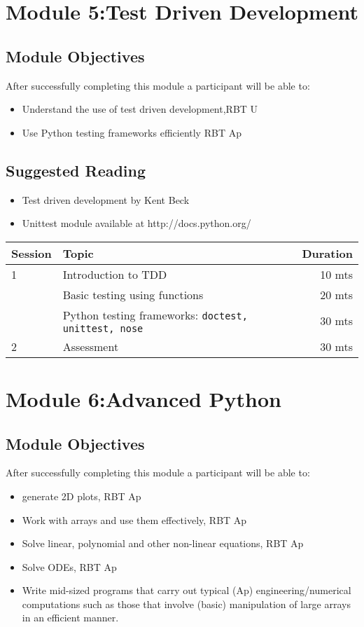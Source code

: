 \documentclass{article}
\begin{document}
\section{Module 5:Test Driven Development}
\label{tdd}
\subsection{Module Objectives}
After successfully completing this module a participant will be able to:
        \begin{itemize}
            \item Understand the use of test driven development,\hfill RBT U
            \item Use Python testing frameworks efficiently  \hfill RBT Ap
        \end{itemize}
\subsection{Suggested Reading}
\begin{itemize}
    \item Test driven development by Kent Beck
    \item Unittest module available at http://docs.python.org/
\end{itemize}

\begin{tabular}{llr}
\hline
Session & Topic & Duration\\\hline
1 & Introduction to TDD                                        & 10 mts\\
  & Basic testing using functions                              & 20 mts\\
  & Python testing frameworks: \tt{doctest, unittest, nose}    & 30 mts\\\hline

2 & Assessment                                                 & 30 mts\\\hline\hline
\end{tabular}

\section{Module 6:Advanced Python}
\label{AP}
\subsection{Module Objectives}
After successfully completing this module a participant will be able to:
        \begin{itemize}
            \item generate 2D plots, \hfill RBT Ap
            \item Work with arrays and use them effectively, \hfill RBT Ap
            \item Solve linear, polynomial and other non-linear equations, \hfill RBT Ap
            \item Solve ODEs, \hfill RBT Ap
            \item Write mid-sized programs that carry out typical (Ap) engineering/numerical computations such as those that involve (basic) manipulation of large arrays in an efficient manner.
        \end{itemize}
\end{document}
